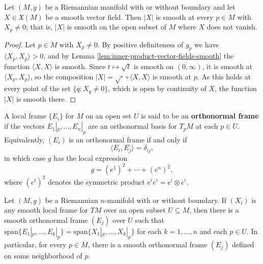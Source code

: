 \begin{lemma}
\label{lem:length-vector-field-smooth}
\leanok
{}
Let $(M,g)$ be a Riemannian manifold with or without boundary and let $X \in \mathfrak{X}(M)$ be a smooth vector field. Then $|X|$ is smooth at every $p \in M$ with $X_p \neq 0$; that is, $|X|$ is smooth on the open subset of $M$ where $X$ does not vanish.
\end{lemma}

\begin{proof}
\leanok
{}
Let $p \in M$ with $X_p \neq 0$. By positive definiteness of $g_p$ we have $\langle X_p, X_p\rangle > 0$, and by Lemma \ref{lem:inner-product-vector-fields-smooth} the function $\langle X, X\rangle$ is smooth. Since $t \mapsto \sqrt{t}$ is smooth on $(0,\infty)$, it is smooth at $\langle X_p, X_p \rangle$, so the composition $|X| = \sqrt{\cdot} \circ \langle X, X\rangle$ is smooth at $p$. As this holds at every point of the set $\{q : X_q \neq 0\}$, which is open by continuity of $X$, the function $|X|$ is smooth there.
\end{proof}

A local frame $\{E_i\}$ for $M$ on an open set $U$ is said to be an \textbf{orthonormal frame} if the vectors $E_1|_p, \ldots, E_n|_p$ are an orthonormal basis for $T_p M$ at each $p \in U$. Equivalently, $(E_i)$ is an orthonormal frame if and only if
\[
\langle E_i, E_j \rangle = \delta_{ij},
\]
in which case $g$ has the local expression
\[
g = (e^1)^2 + \cdots + (e^n)^2,
\]
where $(e^i)^2$ denotes the symmetric product $e^i e^i = e^i \otimes e^i$.

\begin{proposition}
\label{prop:existence-orthonormal-frames}
\leanok
{}

Let $(M, g)$ be a Riemannian $n$-manifold with or without boundary. If $(X_i)$ is any smooth local frame for $TM$ over an open subset $U \subseteq M$, then there is a smooth orthonormal frame $(E_j)$ over $U$ such that $\text{span}\{E_1|_p, \ldots, E_k|_p\} = \text{span}\{X_1|_p, \ldots, X_k|_p\}$ for each $k = 1, \ldots, n$ and each $p \in U$. In particular, for every $p \in M$, there is a smooth orthonormal frame $(E_j)$ defined on some neighborhood of $p$.
\end{proposition}

